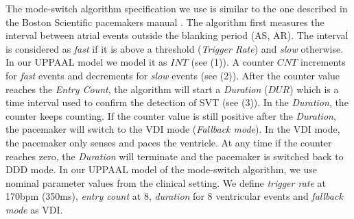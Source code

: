 The mode-switch algorithm specification we use is similar to the one described in the Boston Scientific pacemakers manual \cite{compass}. The algorithm first measures the interval between atrial events outside the blanking period (AS, AR). The interval is considered as \emph{fast} if it is above a threshold (\emph{Trigger Rate}) and \emph{slow} otherwise. In our UPPAAL model we model it as $INT$ (see  (1)). A counter $CNT$ increments for \emph{fast} events and decrements for \emph{slow} events (see  (2)). After the counter value reaches the \emph{Entry Count}, the algorithm will start a \emph{Duration} ($DUR$) which is a time interval used to confirm the detection of SVT (see  (3)). In the \emph{Duration}, the counter keeps counting. If the counter value is still positive after the \emph{Duration}, the pacemaker will switch to the VDI mode (\emph{Fallback mode}). In the VDI mode, the pacemaker only senses and paces the ventricle. At any time if the counter reaches zero, the \emph{Duration} will terminate and the pacemaker is switched back to DDD mode.
In our UPPAAL model of the mode-switch algorithm, we use nominal parameter values from the clinical setting. We define \emph{trigger rate} at 170bpm (350ms), \emph{entry count} at 8, \emph{duration} for 8 ventricular events and \emph{fallback mode} as VDI. 


